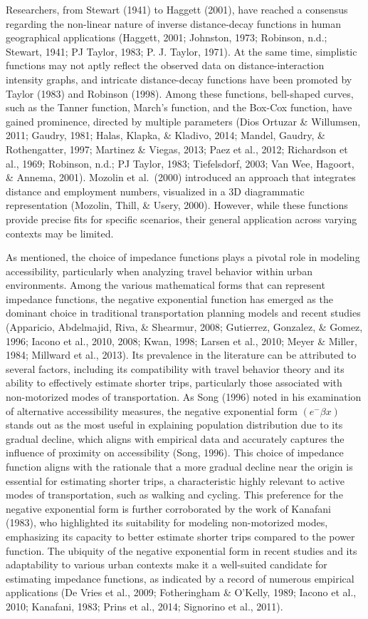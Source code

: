 \documentclass[
11pt, %
oneside, %
english, %
singlespacing, %
]{macthesis} %
\begin{document}
Researchers, from Stewart (1941) to Haggett (2001), have reached a consensus regarding the non-linear nature of inverse distance-decay functions in human geographical applications (Haggett, 2001; Johnston, 1973; Robinson, n.d.; Stewart, 1941; PJ Taylor, 1983; P. J. Taylor, 1971). At the same time, simplistic functions may not aptly reflect the observed data on distance-interaction intensity graphs, and intricate distance-decay functions have been promoted by Taylor (1983) and Robinson (1998). Among these functions, bell-shaped curves, such as the Tanner function, March's function, and the Box-Cox function, have gained prominence, directed by multiple parameters (Dios Ortuzar \& Willumsen, 2011; Gaudry, 1981; Halas, Klapka, \& Kladivo, 2014; Mandel, Gaudry, \& Rothengatter, 1997; Martinez \& Viegas, 2013; Paez et al., 2012; Richardson et al., 1969; Robinson, n.d.; PJ Taylor, 1983; Tiefelsdorf, 2003; Van Wee, Hagoort, \& Annema, 2001). Mozolin et al.~(2000) introduced an approach that integrates distance and employment numbers, visualized in a 3D diagrammatic representation (Mozolin, Thill, \& Usery, 2000). However, while these functions provide precise fits for specific scenarios, their general application across varying contexts may be limited.

As mentioned, the choice of impedance functions plays a pivotal role in modeling accessibility, particularly when analyzing travel behavior within urban environments. Among the various mathematical forms that can represent impedance functions, the negative exponential function has emerged as the dominant choice in traditional transportation planning models and recent studies (Apparicio, Abdelmajid, Riva, \& Shearmur, 2008; Gutierrez, Gonzalez, \& Gomez, 1996; Iacono et al., 2010, 2008; Kwan, 1998; Larsen et al., 2010; Meyer \& Miller, 1984; Millward et al., 2013). Its prevalence in the literature can be attributed to several factors, including its compatibility with travel behavior theory and its ability to effectively estimate shorter trips, particularly those associated with non-motorized modes of transportation. As Song (1996) noted in his examination of alternative accessibility measures, the negative exponential form \((e ^-\beta x)\) stands out as the most useful in explaining population distribution due to its gradual decline, which aligns with empirical data and accurately captures the influence of proximity on accessibility (Song, 1996). This choice of impedance function aligns with the rationale that a more gradual decline near the origin is essential for estimating shorter trips, a characteristic highly relevant to active modes of transportation, such as walking and cycling. This preference for the negative exponential form is further corroborated by the work of Kanafani (1983), who highlighted its suitability for modeling non-motorized modes, emphasizing its capacity to better estimate shorter trips compared to the power function. The ubiquity of the negative exponential form in recent studies and its adaptability to various urban contexts make it a well-suited candidate for estimating impedance functions, as indicated by a record of numerous empirical applications (De Vries et al., 2009; Fotheringham \& O'Kelly, 1989; Iacono et al., 2010; Kanafani, 1983; Prins et al., 2014; Signorino et al., 2011).
\end{document}

